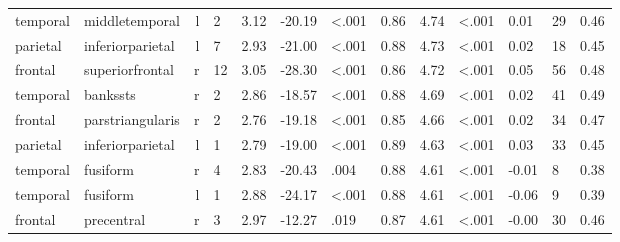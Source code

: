 \documentclass{article}
\begin{document}
\begin{longtable}{llrR{1.3cm}R{1cm}R{1.3cm}R{1cm}R{1cm}R{1.3cm}R{1cm}R{1.8cm}R{1.3cm}R{1.8cm}}
  temporal &            middletemporal &    l &         2 &                  3.12 &           -20.19 &      \textless.001 &                               0.86 &                          4.74 &                   \textless.001 &   0.01 &     29 &      0.46 \\
  parietal &          inferiorparietal &    l &         7 &                  2.93 &           -21.00 &      \textless.001 &                               0.88 &                          4.73 &                   \textless.001 &   0.02 &     18 &      0.45 \\
   frontal &           superiorfrontal &    r &        12 &                  3.05 &           -28.30 &      \textless.001 &                               0.86 &                          4.72 &                   \textless.001 &   0.05 &     56 &      0.48 \\
  temporal &                  bankssts &    r &         2 &                  2.86 &           -18.57 &      \textless.001 &                               0.88 &                          4.69 &                   \textless.001 &   0.02 &     41 &      0.49 \\
   frontal &          parstriangularis &    r &         2 &                  2.76 &           -19.18 &      \textless.001 &                               0.85 &                          4.66 &                   \textless.001 &   0.02 &     34 &      0.47 \\
  parietal &          inferiorparietal &    l &         1 &                  2.79 &           -19.00 &      \textless.001 &                               0.89 &                          4.63 &                   \textless.001 &   0.03 &     33 &      0.45 \\
  temporal &                  fusiform &    r &         4 &                  2.83 &           -20.43 &               .004 &                               0.88 &                          4.61 &                   \textless.001 &  -0.01 &      8 &      0.38 \\
  temporal &                  fusiform &    l &         1 &                  2.88 &           -24.17 &      \textless.001 &                               0.88 &                          4.61 &                   \textless.001 &  -0.06 &      9 &      0.39 \\
   frontal &                precentral &    r &         3 &                  2.97 &           -12.27 &               .019 &                               0.87 &                          4.61 &                   \textless.001 &  -0.00 &     30 &      0.46 \\

\end{longtable}
\end{document}
